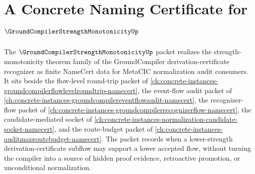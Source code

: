 \chapter{A Concrete Naming Certificate for $\GroundCompilerStrengthMonotonicityUp$}
\label{ch:concrete-instances-groundcompiler-strength-monotonicity-namecert}

The $\GroundCompilerStrengthMonotonicityUp$ packet realizes the strength-monotonicity theorem family of the GroundCompiler derivation-certificate recognizer as finite NameCert data for MetaCIC normalization audit consumers. It sits beside the flow-level round-trip packet of \autoref{ch:concrete-instances-groundcompilerflowlevelroundtrip-namecert}, the event-flow audit packet of \autoref{ch:concrete-instances-groundcompilereventflowaudit-namecert}, the recognizer-flow packet of \autoref{ch:concrete-instances-groundcompilerrecognizerflow-namecert}, the candidate-mediated socket of \autoref{ch:concrete-instances-normalization-candidate-socket-namecert}, and the route-budget packet of \autoref{ch:concrete-instances-auditmaproutebudget-namecert}. The packet records when a lower-strength derivation-certificate subflow may support a lower accepted flow, without turning the compiler into a source of hidden proof evidence, retroactive promotion, or unconditional normalization.

